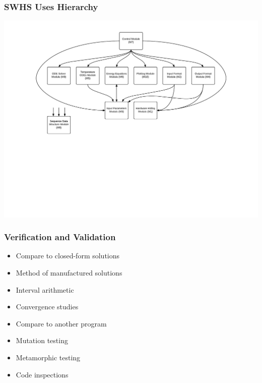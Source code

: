 \documentclass{beamer}
\begin{document}
\begin{frame}

\frametitle{SWHS Uses Hierarchy}

\begin{center}
\includegraphics[scale=0.57]{UsesHierarchy.pdf}
\end{center}

\end{frame}
\hoffset=0in


\begin{frame}

\frametitle{Verification and Validation}

\begin{itemize}
\item Compare to closed-form solutions
\item Method of manufactured solutions
\item Interval arithmetic
\item Convergence studies
\item Compare to another program
\item Mutation testing
\item Metamorphic testing
\item Code inspections
\end{itemize}

\end{frame}

\end{document}
